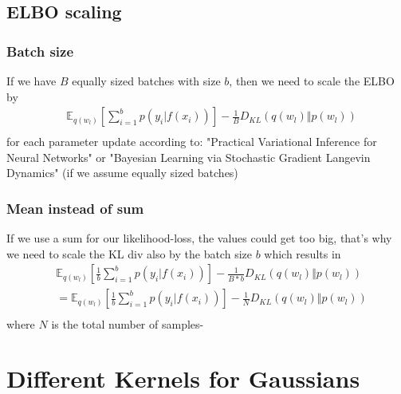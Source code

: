 \documentclass[a4paper]{scrartcl}
\begin{document}
  \subsection{ELBO scaling}
    \subsubsection{Batch size}
      If we have $B$ equally sized batches with size $b$, then we need to scale the ELBO by
      \begin{align*}
        & \mathbb{E}_{q(w_l)}[\sum_{i=1}^b p(y_i \vert f(x_i))] - \frac{1}{B} D_{KL}(q(w_l) \Vert p(w_l))\\
      \end{align*}
      for each parameter update according to: "Practical Variational Inference
      for Neural Networks"
      or "Bayesian Learning via Stochastic Gradient Langevin Dynamics" (if we assume equally sized batches)

    \subsubsection{Mean instead of sum}
      If we use a sum for our likelihood-loss, the values could get too big,
      that's why we need to scale the KL div also by the batch size $b$ which results in
      \begin{align*}
        & \mathbb{E}_{q(w_l)}[\frac{1}{b}\sum_{i=1}^b p(y_i \vert f(x_i))] - \frac{1}{B *b} D_{KL}(q(w_l) \Vert p(w_l))\\
        &= \mathbb{E}_{q(w_l)}[\frac{1}{b}\sum_{i=1}^b p(y_i \vert f(x_i))] - \frac{1}{N} D_{KL}(q(w_l) \Vert p(w_l))\\
      \end{align*}
      where $N$ is the total number of samples-


\section{Different Kernels for Gaussians}
\end{document}
